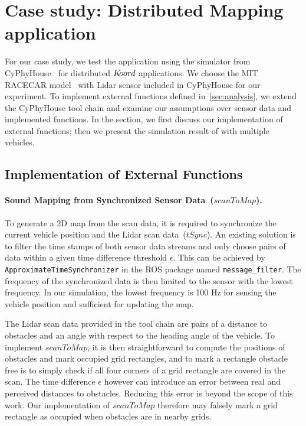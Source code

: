 \newcommand{\Koord}{\ensuremath{\lgname}\xspace}
\newcommand{\CyPhyHouse}{CyPhyHouse\xspace}
\newcommand{\Gazebo}{Gazebo\xspace}

\newcommand{\ScanToMap}{\ensuremath{\mathit{scanToMap}}\xspace}
\newcommand{\TSync}{\ensuremath{\mathit{tSync}}\xspace}
\newcommand{\PathToFrontier}{\ensuremath{\mathit{pickPathToFrontier}}\xspace}

\section{Case study: Distributed Mapping application}
\label{sec:experims}

For our case study, we test the \dmap application using the simulator from \CyPhyHouse~\cite{ghosh2019cyphyhouse} for distributed \Koord applications.
We choose the MIT RACECAR model~\cite{MIT_RACECAR} with Lidar sensor included in \CyPhyHouse for our experiment.
To implement external functions defined in~\ref{sec:analysis},
we extend the \CyPhyHouse tool chain and examine our assumptions over sensor data and implemented functions.
In the section, we first discuss our implementation of external functions;
then we present the simulation result of \dmap with multiple vehicles.


\subsection{Implementation of External Functions}

\paragraph{Sound Mapping from Synchronized Sensor Data~(\ScanToMap).}
To generate a 2D map from the scan data,
it is required to synchronize the current vehicle position and the Lidar scan data~(\TSync).
An existing solution is to filter the time stamps of both sensor data streams
and only choose pairs of data within a given time difference threshold $\epsilon$.
This can be achieved by \texttt{ApproximateTimeSynchronizer} in the ROS package named \texttt{message\_filter}.
The frequency of the synchronized data is then limited to the sensor with the lowest frequency.
In our simulation, the lowest frequency is 100 Hz for sensing the vehicle position and sufficient for updating the map.

The Lidar scan data provided in the tool chain are pairs of a distance to obstacles and an angle with respect to the heading angle of the vehicle.
To implement \ScanToMap, it is then straightforward to compute the positions of obstacles and mark occupied grid rectangles,
and to mark a rectangle obstacle free is to simply check if all four corners of a grid rectangle are covered in the scan.
The time difference $\epsilon$ however can introduce an error between real and perceived distances to obstacles.
Reducing this error is beyond the scope of this work.
Our implementation of \ScanToMap therefore may falsely mark a grid rectangle as occupied when obstacles are in nearby grids.

